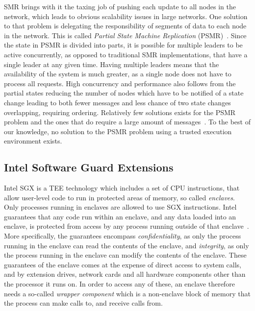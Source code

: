 \documentclass{article}
\begin{document}
		SMR brings with it the taxing job of pushing each update to all nodes in the network, which leads to obvious scalability issues in large networks.
		One solution to that problem is delegating the responsibility of segments of data to each node in the network.
		This is called \textit{Partial State Machine Replication} (PSMR)~\cite{sousa_partial_2001}.
		Since the state in PSMR is divided into parts, it is possible for multiple leaders to be active concurrently, as opposed to traditional SMR implementations, that have a single leader at any given time.
		Having multiple leaders means that the availability of the system is much greater, as a single node does not have to process all requests.
		High concurrency and performance also follows from the partial states reducing the number of nodes which have to be notified of a state change leading to both fewer messages and less chance of two state changes overlapping, requiring ordering.
		Relatively few solutions exists for the PSMR problem and the ones that do require a large amount of messages~\cite{sousa_partial_2001}.
		To the best of our knowledge, no solution to the PSMR problem using a trusted execution environment exists.

		\subsection{Intel Software Guard Extensions}
		\label{subsec:intel-sgx}

		Intel SGX is a TEE technology which includes a set of CPU instructions, that allow user-level code to run in protected areas of memory, so called \textit{enclaves}.
		Only processes running in enclaves are allowed to use SGX instructions.
		Intel guarantees that any code run within an enclave, and any data loaded into an enclave, is protected from access by any process running outside of that enclave~\cite{intel_sgx}.
		More specifically, the guarantees encompass \textit{confidentiality}, as only the process running in the enclave can read the contents of the enclave, and \textit{integrity}, as only the process running in the enclave can modify the contents of the enclave.
		These guarantees of the enclave comes at the expense of direct access to system calls, and by extension drives, network cards and all hardware components other than the processor it runs on.
		In order to access any of these, an enclave therefore needs a so-called \textit{wrapper component} which is a non-enclave block of memory that the process can make calls to, and receive calls from.
\end{document}
